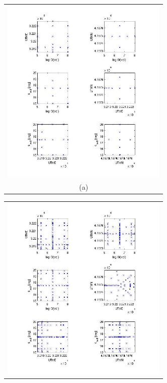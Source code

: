\documentclass{article}
\newcommand{\Pic}[2][0.85]{\begin{center}\texttt{[image: \#2]}
 \end{center} }
\begin{document}
\begin{figure}[H]
      \begin{minipage}[b]{0.6\textwidth}
        \begin{tabular}{c}
       \includegraphics[width=8cm,height=9cm,keepaspectratio]{fig/picsdistrib/Clenshaw_grid.jpg}\\
        (a)
        \end{tabular}
    \end{minipage}
      \begin{minipage}[b]{0.6\textwidth}
        \begin{tabular}{c}
       \includegraphics[width=8cm,height=9cm,keepaspectratio]{fig/picsdistrib/Clenshaw_grid_160.jpg}\\

\end{tabular}
\end{minipage}
\end{figure}
\end{document}
